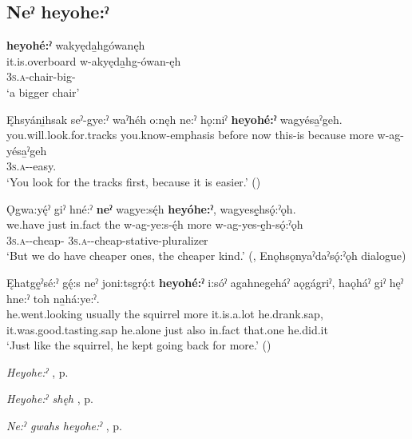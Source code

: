 \subsection*{\textbf{Neˀ heyohe:ˀ} } \label{p:[neˀ heyohe:ˀ]}

\ea
\label{ex:npar17}
\glll \textbf{heyohé:ˀ} wakyęda̱hgówanęh\\
it.is.overboard w-akyęda̱hg-ówan-ęh\\
{} \textsc{3s.a}-chair-big-{\stative}\\
\glt ‘a bigger chair’
\z

\ea
\label{ex:npar18}
\glll Ęhsyáni̱hsak seˀ-gye:ˀ waˀhéh o:nęh ne:ˀ hǫ:niˀ \textbf{heyohé:ˀ} wagyésa̱ˀgeh.\\
you.will.look.for.tracks you.know-emphasis before now this-is because more w-ag-yésa̱ˀgeh\\
{} {} {} {} {} {} {} \textsc{3s.a}-{\semireflexive}-easy.{\stative}\\
\glt ‘You look for the tracks first, because it is easier.’ (\cite{mithun_how_1980})
\z

\ea
\label{ex:npar19}
\glll Ǫgwa:yę́ˀ giˀ hné:ˀ \textbf{neˀ} wagye:sę́h \textbf{heyóhe:ˀ}, wagyesę̱hsǫ́:ˀǫh.\\
we.have just in.fact the w-ag-ye:s-ę́h more w-ag-yes-ę̱h-sǫ́:ˀǫh\\
{} {} {} {} \textsc{3s.a}-{\semireflexive}-cheap-{\stative} {} \textsc{3s.a}-{\semireflexive}-cheap-stative-pluralizer\\
\glt ‘But we do have cheaper ones, the cheaper kind.’ (\cite[159]{mithun_watewayestanih_1984}, Enǫhsǫnyaˀdaˀsǫ́:ˀǫh dialogue)
\z

\ea
\label{ex:npar20}
\gll Ęhatgę̱ˀsé:ˀ gę́:s neˀ joni:tsgrǫ́:t \textbf{heyohé:ˀ} i:sóˀ agahnegeháˀ aǫgágriˀ, haǫháˀ giˀ hęˀ hne:ˀ toh na̱há:ye:ˀ.\\
he.went.looking usually the squirrel more it.is.a.lot he.drank.sap, it.was.good.tasting.sap he.alone just also in.fact that.one he.did.it\\
\glt ‘Just like the squirrel, he kept going back for more.’ (\cite{carrier_legends_2013})
\z

\begin{CayugaRelated}
\item \textit{Heyohe:ˀ} , p. \pageref{p:[heyohe:ˀ]}\\
\item \textit{Heyohe:ˀ shęh} , p. \pageref{p:[heyohe:ˀ shęh]}\\
\item \textit{Ne:ˀ gwahs heyohe:ˀ} , p. \pageref{p:[ne:ˀ gwahs heyohe:ˀ]}
\end{CayugaRelated}

